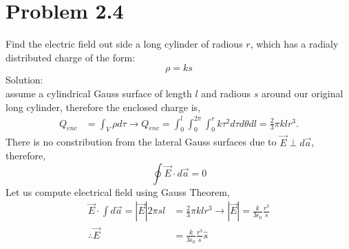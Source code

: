 \section{Problem 2.4}
Find the electric field out side a long cylinder of radious $r$, which has a radialy distributed charge of the form: 
\begin{equation*}
\rho = k s
\end{equation*} 
Solution: \\
assume a cylindrical Gauss surface of length $l$ and radious $s$ around our original long cylinder, therefore the enclosed charge is,
\begin{align}
	Q_{enc} &= \int_{V} \rho d\tau \rightarrow Q_{enc} = \int_{0}^{l} \int_{0}^{2\pi} \int_{0}^{r} k\tau^2 d\tau d\theta dl = \frac{2}{3}\pi klr^3.
\end{align}
There is no constribution from the lateral Gauss surfaces due to $\vec{E} \perp d\vec{a}$, therefore,
\begin{equation}
	\oint \vec{E}\cdot d\vec{a} = 0
\end{equation}
Let us compute electrical field using Gauss Theorem,
\begin{align}
	\vec{E}\cdot \int d\vec{a} = |\vec{E}|2\pi s l &= \frac{2}{3}\pi klr^3 \rightarrow |\vec{E}|=\frac{k}{3\epsilon_0}\frac{r^3}{s} \\
	\therefore \vec{E} &= \frac{k}{3\epsilon_0}\frac{r^3}{s}\hat{s}
\end{align}


